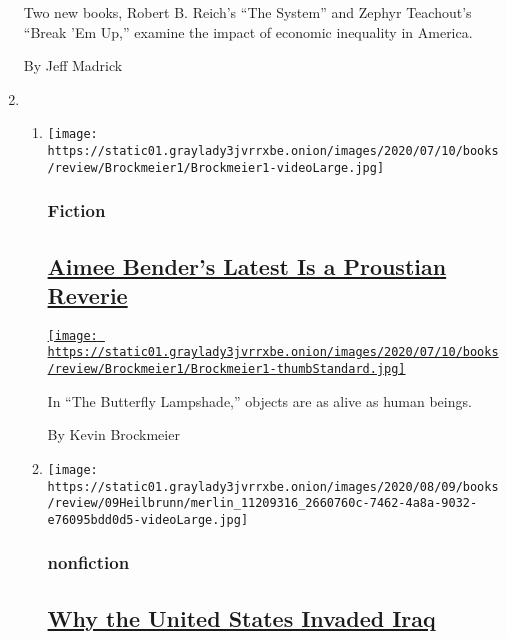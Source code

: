 \begin{enumerate}
  Two new books, Robert B. Reich's ``The System'' and Zephyr Teachout's
  ``Break 'Em Up,'' examine the impact of economic inequality in
  America.

  By Jeff Madrick
\item
  \begin{enumerate}
  \def\labelenumii{\arabic{enumii}.}
  \item
    \texttt{[image: https://static01.graylady3jvrrxbe.onion/images/2020/07/10/books/review/Brockmeier1/Brockmeier1-videoLarge.jpg]}

    \hypertarget{fiction}{%
    \subsubsection{Fiction}\label{fiction}}

    \hypertarget{aimee-benders-latest-is-a-proustian-reverie}{%
    \subsection{\texorpdfstring{\href{/2020/07/28/books/review/aimee-bender-the-butterfly-lampshade.html}{Aimee
    Bender's Latest Is a Proustian
    Reverie}}{Aimee Bender's Latest Is a Proustian Reverie}}\label{aimee-benders-latest-is-a-proustian-reverie}}

    \href{/2020/07/28/books/review/aimee-bender-the-butterfly-lampshade.html}{\texttt{[image: https://static01.graylady3jvrrxbe.onion/images/2020/07/10/books/review/Brockmeier1/Brockmeier1-thumbStandard.jpg]}}

    In ``The Butterfly Lampshade,'' objects are as alive as human
    beings.

    By Kevin Brockmeier
  \item
    \texttt{[image: https://static01.graylady3jvrrxbe.onion/images/2020/08/09/books/review/09Heilbrunn/merlin\_11209316\_2660760c-7462-4a8a-9032-e76095bdd0d5-videoLarge.jpg]}

    \hypertarget{nonfiction-2}{%
    \subsubsection{nonfiction}\label{nonfiction-2}}

    \hypertarget{why-the-united-states-invaded-iraq}{%
    \subsection{\texorpdfstring{\href{/2020/07/28/books/review/to-start-a-war-robert-draper.html}{Why
    the United States Invaded
    Iraq}}{Why the United States Invaded Iraq}}\label{why-the-united-states-invaded-iraq}}


\end{enumerate}
\end{enumerate}
